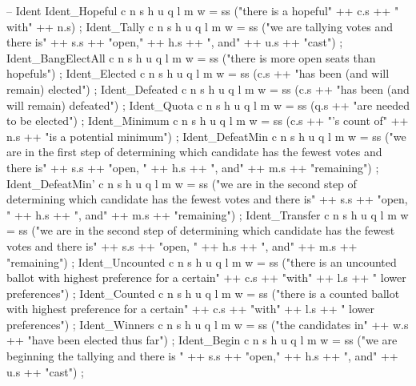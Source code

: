 \begin{lstgf}
{        -- Ident
        Ident_Hopeful c n s h u q l m w
            = ss ("there is a hopeful" ++ c.s ++ " with" ++ n.s) ;
        Ident_Tally c n s h u q l m w
            = ss ("we are tallying votes and there is" ++ s.s ++ "open," ++ h.s ++ ", and" ++ u.s ++ "cast") ;
        Ident_BangElectAll c n s h u q l m w
            = ss ("there is more open seats than hopefuls") ;
        Ident_Elected c n s h u q l m w
            = ss (c.s ++ "has been (and will remain) elected") ;
        Ident_Defeated c n s h u q l m w
            = ss (c.s ++ "has been (and will remain) defeated") ;
        Ident_Quota c n s h u q l m w
            = ss (q.s ++ "are needed to be elected") ;
        Ident_Minimum c n s h u q l m w
            = ss (c.s ++ "'s count of" ++ n.s ++ "is a potential minimum") ;
        Ident_DefeatMin c n s h u q l m w
            = ss ("we are in the first step of determining which candidate has the fewest votes and there is" 
		    ++ s.s ++ "open, " ++ h.s ++ ", and" ++ m.s ++ "remaining") ;
        Ident_DefeatMin' c n s h u q l m w
            = ss ("we are in the second step of determining which candidate has the fewest votes and
		    there is" ++ s.s ++ "open, " ++ h.s ++ ", and" ++ m.s ++ "remaining") ;
        Ident_Transfer c n s h u q l m w
            = ss ("we are in the second step of determining which candidate has the fewest votes and 
		    there is" ++ s.s ++ "open, " ++ h.s ++ ", and" ++ m.s ++ "remaining") ;
        Ident_Uncounted c n s h u q l m w
            = ss ("there is an uncounted ballot with highest preference for a certain" ++ c.s ++ "with" 
		    ++ l.s ++ " lower preferences") ;
        Ident_Counted c n s h u q l m w
            = ss ("there is a counted ballot with highest preference for a certain" ++ c.s ++ "with" ++ l.s 
		    ++ " lower preferences") ;
        Ident_Winners c n s h u q l m w
            = ss ("the candidates in" ++ w.s ++ "have been elected thus far") ;
        Ident_Begin c n s h u q l m w
            = ss ("we are beginning the tallying and there is " ++ s.s ++ "open," ++ h.s ++ ", and" ++ u.s 
		    ++ "cast") ;

}
\end{lstgf}
